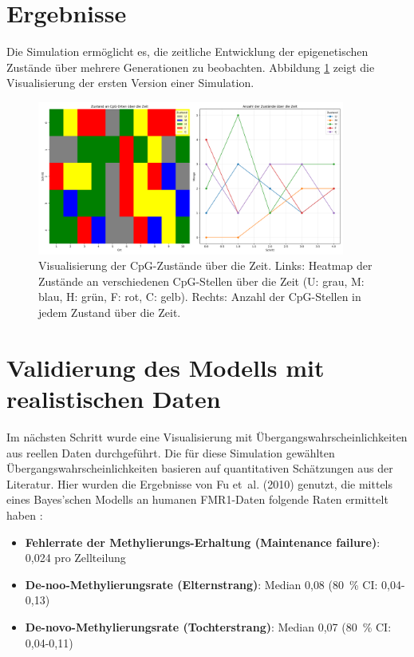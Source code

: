 \documentclass{SeminarV2}
\begin{document}
\section{Ergebnisse}
Die Simulation erm\"{o}glicht es, die zeitliche Entwicklung der epigenetischen Zust\"{a}nde 
\"{u}ber mehrere Generationen zu beobachten. Abbildung \ref{fig:cpg_states} zeigt die Visualisierung der ersten Version einer Simulation.
\begin{figure}[htbp]
    \centering
    \includegraphics[width=0.9\textwidth]{images/cpg_states_plot.png}
    \caption{Visualisierung der CpG-Zust\"{a}nde \"{u}ber die Zeit. Links: Heatmap der Zust\"{a}nde an verschiedenen 
    CpG-Stellen \"{u}ber die Zeit (U: grau, M: blau, H: gr\"{u}n, F: rot, C: gelb). Rechts: Anzahl der CpG-Stellen in jedem Zustand \"{u}ber die Zeit.}
    \label{fig:cpg_states}
\end{figure}
\section{Validierung des Modells mit realistischen Daten}
Im n\"{a}chsten Schritt wurde eine Visualisierung mit \"{U}bergangswahrscheinlichkeiten aus reellen Daten durchgef\"{u}hrt. Die f\"{u}r diese Simulation gew\"{a}hlten \"{U}bergangswahrscheinlichkeiten basieren auf quantitativen Sch\"{a}tzungen aus der Literatur.  
Hier wurden die Ergebnisse von Fu et al. (2010) genutzt, die mittels eines Bayes'schen Modells an humanen FMR1-Daten folgende Raten ermittelt haben \cite{fu-2010}:
\begin{itemize}
  \item \textbf{Fehlerrate der Methylierungs-Erhaltung (Maintenance failure)}: 0{,}024 pro Zellteilung  
  \item \textbf{De-noo-Methylierungsrate (Elternstrang)}: Median 0{,}08 (80 \% CI: 0,04-0,13)  
  \item \textbf{De-novo-Methylierungsrate (Tochterstrang)}: Median 0{,}07 (80 \% CI: 0,04-0,11)  
\end{itemize}
\end{document}
